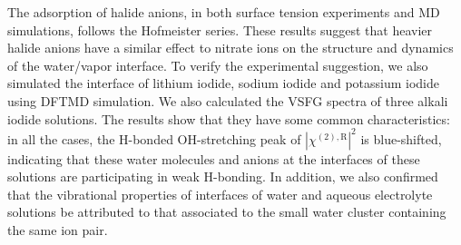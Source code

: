 The adsorption of halide anions, in both surface tension experiments and MD simulations, 
follows the Hofmeister series\cite{Jungwirth2006,Pegram2007,ZhangJY2010,Tobias2008,Parsons2011,HuaWei2013}.
These results suggest that heavier halide anions have a similar effect to nitrate ions on the structure and dynamics of the water/vapor interface. 
To verify the experimental suggestion, we also simulated the interface of lithium iodide, sodium iodide and potassium iodide  using DFTMD simulation.
We also calculated the VSFG spectra of three alkali iodide solutions. 
The results show that they have some common characteristics: in all the cases, 
the H-bonded OH-stretching peak of $|\chi^{(2),\text{R}}|^2$ is blue-shifted, 
indicating that these water molecules and anions at the interfaces of these solutions are participating in weak H-bonding.
In addition, we also confirmed that the vibrational properties of interfaces of water and aqueous electrolyte solutions be attributed to 
that associated to the small water cluster containing the same ion pair.

